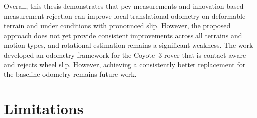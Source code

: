 \documentclass[report.tex]{subfiles}
\begin{document}
    Overall, this thesis demonstrates that \gls{pcv} measurements and innovation-based measurement rejection can improve local translational odometry on deformable terrain and under conditions with pronounced slip. However, the proposed approach does not yet provide consistent improvements across all terrains and motion types, and rotational estimation remains a significant weakness. The work developed an odometry framework for the Coyote~3 rover that is contact-aware and rejects wheel slip. However, achieving a consistently better replacement for the baseline odometry remains future work.
    
    \section{Limitations}
    \label{sec:limitations}
    
\end{document}
